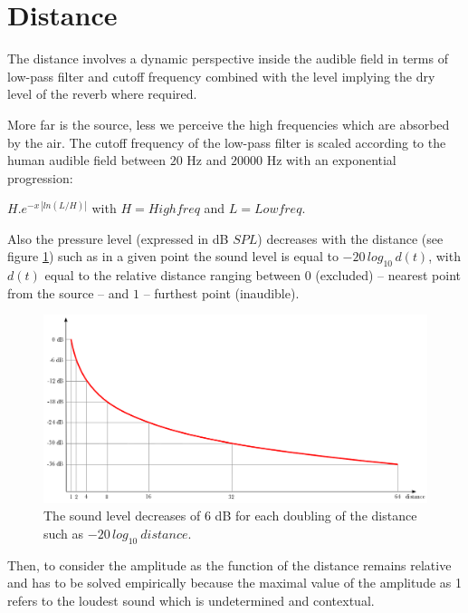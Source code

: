 \documentclass{book}
\begin{document}
\newpage
\section{Distance}
\label{dist}

The distance involves a dynamic perspective inside the audible field in terms of low-pass filter and cutoff frequency combined with the level implying the dry level of the reverb where required.
\smallskip

More far is the source, less we perceive the high frequencies which are absorbed by the air.
The cutoff frequency of the low-pass filter is scaled according to the human audible field between $20$ Hz and $20000$ Hz with an exponential progression: 
\smallskip

$H.e^{\displaystyle -x \, \left | ln ( L/H ) \right |}$  with $H=High freq$ and $L=Low freq$.
\bigskip

Also the pressure level (expressed in dB $SPL$) decreases with the distance (see figure \ref{fig:dist}) such as in a given point the sound level is equal to \hbox{$-20\,log_{10}\,d(t)$}, with $d(t)$ equal to the relative distance ranging between $0$ (excluded) -- nearest point from the source -- and $1$ -- furthest point (inaudible).
\smallskip

 \begin{figure}[H]
\begin{center}
\includegraphics[scale=0.33]{img/6094}
\caption{The sound level decreases of 6 dB for each doubling of the distance such as $-20\,log_{10}\: distance$. }
\label{fig:dist}
\end{center}
\end{figure}

Then, to consider the amplitude as the function of the distance remains relative and has to be solved empirically because the maximal value of the amplitude as 1 refers to the loudest sound which is undetermined and contextual.
\end{document}
